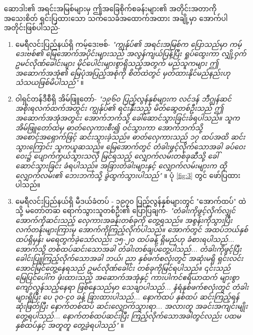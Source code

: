 \documentclass[10pt,twocolumn,letterpaper]{article}
\begin{document}
ဆောဒါး၏ အရင်းအမြစ်များမှ ဤအခြေစိုက်စခန်းများ၏ အတိုင်းအတာကို အသေးစိတ် ရှင်းပြထားသော သက်သေခံအထောက်အထား အချို့မှာ အောက်ပါအတိုင်းဖြစ်ပါသည်-
\begin{flushleft}
\begin{enumerate}
    \item မေရီလင်းပြည်နယ်ရှိ ကမ့်ဒေးဗစ်- \textit{"ကျွန်ုပ်၏ အရင်းအမြစ်က ပြောသည်မှာ ကမ့်ဒေးဗစ်၏ မြေအောက်အပိုင်းများသည် အလွန်ကျယ်ပြန့်ပြီး ရှုပ်ထွေးကာ လျှို့ဝှက်ဥမင်လိုဏ်ခေါင်းများ မိုင်ပေါင်းများစွာရှိသည့်အတွက် မည်သူကများ ဤအဆောက်အအုံ၏ မြေပုံအပြည့်အစုံကို စိတ်ထဲတွင် မှတ်ထားနိုင်မည်နည်းဟု သံသယဖြစ်မိပါသည်"} \cite{22}။
    \item ဝါရှင်တန်ဒီစီရှိ အိမ်ဖြူတော်- \textit{"၁၉၆၀ ပြည့်လွန်နှစ်များက လင်ဒန် ဘီဂျွန်ဆင် အစိုးရလက်ထက်အတွင်း ကျွန်ုပ်၏ ရင်းနှီးသည့် မိတ်ဆွေတစ်ဦးသည် ဤအဆောက်အအုံအတွင်း အောက်ဘက်သို့ ခေါ်ဆောင်သွားခြင်းခံရပါသည်။ သူက အိမ်ဖြူတော်ထဲမှ ဓာတ်လှေကားစီး၍ ဝင်သွားကာ အောက်ဘက်သို့ အစောင့်အရှောက်ဖြင့် ဆင်းသွားခဲ့သည်။ ဓာတ်လှေကားသည် ၁၇ ထပ်အထိ ဆင်းသွားကြောင်း သူကယူဆသည်။ မြေအောက်တွင် တံခါးဖွင့်လိုက်သောအခါ ခပ်ဝေးဝေး၌ ပျောက်ကွယ်သွားသလို မြင်ရသည့် လျှောက်လမ်းတစ်ခုဆီသို့ ခေါ်ဆောင်သွားခြင်း ခံရပါသည်။ အခြားတံခါးများနှင့် လျှောက်လမ်းများက ထိုလျှောက်လမ်း၏ ဘေးဘက်သို့ ခွဲထွက်သွားပါသည်"} \cite{22}။ ပုံ \ref{fig:3} တွင် ဖော်ပြထားပါသည်။
    \item မေရီလင်းပြည်နယ်ရှိ မီဒယ်ခံတပ် - ၁၉၇၀ ပြည့်လွန်နှစ်များတွင် "အောက်ထပ်" ထဲသို့ မတော်တဆ ရောက်သွားသူတစ်ဦး၏ ပြောပြချက်- \textit{"တံခါးကိုဖွင့်လိုက်လျှင် အောက်ကိုဆင်းသည့် လှေကားအခန်းတစ်ခုကို တွေ့ရသည်။ အစွန်းကိုသွားပြီး လက်တန်းများကြားမှ အောက်ကိုကြည့်လိုက်ပါသည်။ အောက်တွင် အထပ်ဘယ်နှစ်ထပ်ရှိမှန်း မရေတွက်ခဲ့သော်လည်း ၁၅-၂၀ ထပ်ခန့် ရှိမည်ဟု ခံစားရပါသည်... အောက်သို့ တစ်ထပ်ဆင်းသောအခါ တံခါးတစ်ချပ်တွေ့ပါသည်... တံခါးကိုဖွင့်ပြီး ခေါင်းပြူကြည့်လိုက်သောအခါ ဘယ်၊ ညာ နှစ်ဖက်စလုံးတွင် အဆုံးမရှိ ရှင်းလင်းအောင်မြင်တွေ့နေရသည် ဥမင်လိုဏ်ခေါင်း တစ်ခုကိုမြင်ရပါသည်။ ၎င်းသည် မြေပြင်ပေါ်က ဖုံးထားသည့် အဆောက်အအုံနှင့် ကားပါကင်ဧရိယာထက် များစွာ ကျော်လွန်သည့်နေရာ ဖြစ်နေသည်မှာ သေချာပါသည်... နံရံနှစ်ဖက်စလုံးတွင် တံခါးများရှိပြီး ပေ ၃၀-၄၀ ခန့် ခြားထားပါသည်... နောက်ထပ် နှစ်ထပ် ဆင်းကြည့်ရန် ဆုံးဖြတ်ပြီး နောက်တစ်ထပ် ဆင်းလျှောက်သွားရာ... အလားတူ အခင်းအကျင်းမျိုး တွေ့ရပါသည်... နောက်တစ်ထပ်ဆင်းပြီး ကြည့်လိုက်သောအခါတွင်လည်း ပထမနှစ်ထပ်နှင့် အတူတူ တွေ့ခဲ့ရပါသည်"} \cite{22}။
\end{enumerate}
\end{flushleft}
\end{document}
